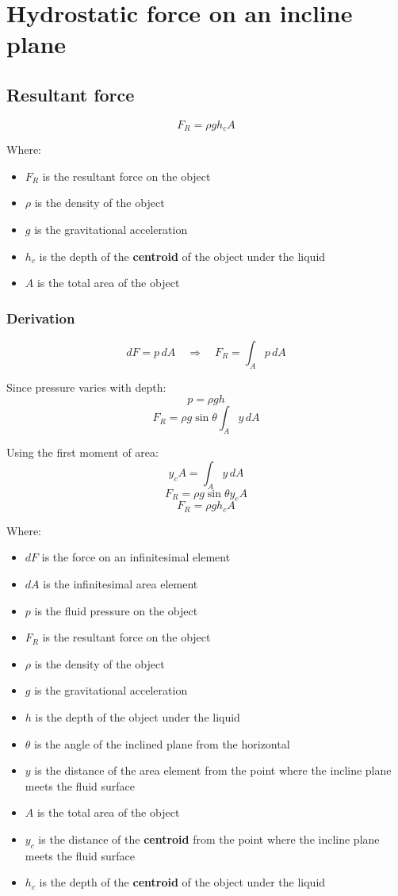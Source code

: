 \documentclass[11pt]{article}
\begin{document}
\newpage

\section{Hydrostatic force on an incline plane}
\label{sec:org38c7700}

\subsection{Resultant force}
\label{sec:orgf36c3ff}
\[F_R = \rho g h_c A\]

Where:
\begin{itemize}
\item \(F_R\) is the resultant force on the object
\item \(\rho\) is the density of the object
\item \(g\) is the gravitational acceleration
\item \(h_c\) is the depth of the \textbf{centroid} of the object under the liquid
\item \(A\) is the total area of the object
\end{itemize}

\newpage

\subsubsection{Derivation}
\label{sec:orga83bc68}
\[dF = p \, dA \quad \Rightarrow \quad F_R = \int_A p \, dA\]

Since pressure varies with depth:
\[p = \rho g h\]
\[F_R = \rho g \sin \theta \int_A y \, dA\]

Using the first moment of area:
\[y_c A = \int_A y \, dA\]
\[F_R = \rho g \sin \theta y_c A\]
\[F_R = \rho g h_c A\]

Where:
\begin{itemize}
\item \(dF\) is the force on an infinitesimal element
\item \(dA\) is the infinitesimal area element
\item \(p\) is the fluid pressure on the object
\item \(F_R\) is the resultant force on the object
\item \(\rho\) is the density of the object
\item \(g\) is the gravitational acceleration
\item \(h\) is the depth of the object under the liquid
\item \(\theta\) is the angle of the inclined plane from the horizontal
\item \(y\) is the distance of the area element from the point where the incline plane meets the fluid surface
\item \(A\) is the total area of the object
\item \(y_c\) is the distance of the \textbf{centroid} from the point where the incline plane meets the fluid surface
\item \(h_c\) is the depth of the \textbf{centroid} of the object under the liquid
\end{itemize}
\end{document}
